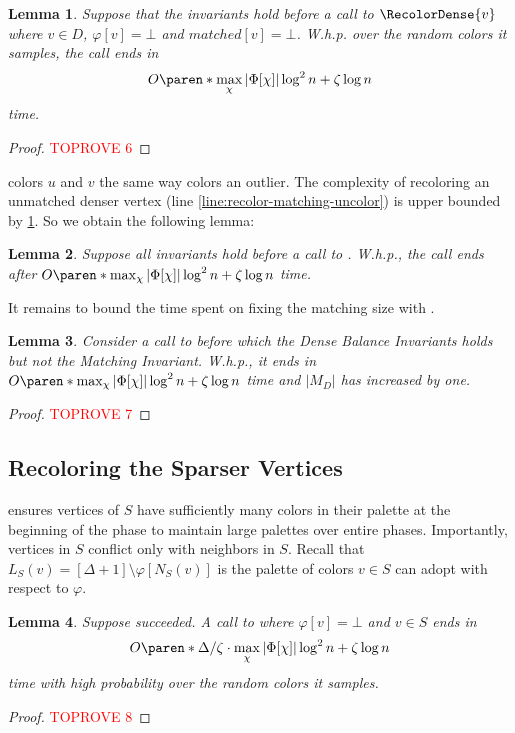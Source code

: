 \documentclass[a4paper,english,11pt]{amsart}
\newtheorem{lemma}{Lemma}[section]
\theoremstyle{definition}
\DeclarePairedDelimiter{\paren}()
\newcommand{\col}{\varphi}
\newcommand{\NS}{N_{S}}
\newcommand{\LS}{L_{S}}
\begin{document}
\begin{lemma}
    \label{lem:recolor-denser}
    Suppose that the invariants hold before a call to $\RecolorDense{v}$ where $v\in D$, $\col[v] = \bot$ and $matched[v] = \bot$.
W.h.p. over the random colors it samples, the call ends in
    \[ O\paren*{ \max_{\chi} |\Phi[\chi]| \log^2 n + \zeta \log n } \]
    time.
\end{lemma}

\begin{proof}\textcolor{red}{TOPROVE 6}\end{proof}


\RecolorMatching colors $u$ and $v$ the same way \RecolorDense colors an outlier. The complexity of recoloring an unmatched denser vertex (line \ref{line:recolor-matching-uncolor}) is upper bounded by \cref{lem:recolor-denser}. So we obtain the following lemma:
\begin{lemma}
    \label{lem:recolor-matching}
    Suppose all invariants hold before a call to . W.h.p., the call ends after
    $O\paren*{ \max_{\chi} |\Phi[\chi]| \log^2 n + \zeta \log n }$
    time.
\end{lemma}

It remains to bound the time spent on fixing the matching size with \AddAntiEdgeMatching.
\begin{lemma}
    \label{lem:increase-matching-time}
    Consider a call to  before which the Dense Balance Invariants holds but not the Matching Invariant. W.h.p., it ends in
    $O\paren*{ \max_{\chi} |\Phi[\chi]| \log^2 n + \zeta \log n }$
    time and $|M_D|$ has increased by one.
\end{lemma}
\begin{proof}\textcolor{red}{TOPROVE 7}\end{proof}


\subsection{Recoloring the Sparser Vertices}
\label{sec:sparser}

\FreshColoring ensures vertices of $S$ have sufficiently many colors in their palette at the beginning of the phase to maintain large palettes over entire phases. Importantly, vertices in $S$ conflict only with neighbors in $S$.
Recall that $\LS(v) = [\Delta + 1] \setminus \col[\NS(v)]$ is the palette of colors $v\in S$ can adopt with respect to $\col$.


\begin{lemma}
    \label{cor:recolor-sparse-time}
    Suppose \FreshColoring succeeded.
    A call to  where $\col[v]=\bot$ and $v\in S$ ends in
    \[
    O\paren*{
        \Delta / \zeta \cdot \max_{\chi} |\Phi[\chi]| \log^2 n +
        \zeta\log n
    }
    \] time with high probability over the random colors it samples.
\end{lemma}
\begin{proof}\textcolor{red}{TOPROVE 8}\end{proof}
\end{document}
